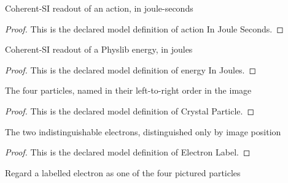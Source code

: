 \begin{definition}
  \label{def:physics:phyx-mini-0535:phyxminiproblems-problemphyxmini0535-actioninjouleseconds}
  Coherent-SI readout of an action, in joule-seconds
\end{definition}
\begin{proof}
  This is the declared model definition of action In Joule Seconds.
\end{proof}
\begin{definition}
  \label{def:physics:phyx-mini-0535:phyxminiproblems-problemphyxmini0535-energyinjoules}
  Coherent-SI readout of a Physlib energy, in joules
\end{definition}
\begin{proof}
  This is the declared model definition of energy In Joules.
\end{proof}
\begin{definition}
  \label{def:physics:phyx-mini-0535:phyxminiproblems-problemphyxmini0535-crystalparticle}
  The four particles, named in their left-to-right order in the image
\end{definition}
\begin{proof}
  This is the declared model definition of Crystal Particle.
\end{proof}
\begin{definition}
  \label{def:physics:phyx-mini-0535:phyxminiproblems-problemphyxmini0535-electronlabel}
  The two indistinguishable electrons, distinguished only by image position
\end{definition}
\begin{proof}
  This is the declared model definition of Electron Label.
\end{proof}
\begin{definition}[particle]
  \label{def:physics:phyx-mini-0535:phyxminiproblems-problemphyxmini0535-electronlabel-particle}
  Regard a labelled electron as one of the four pictured particles
\end{definition}
